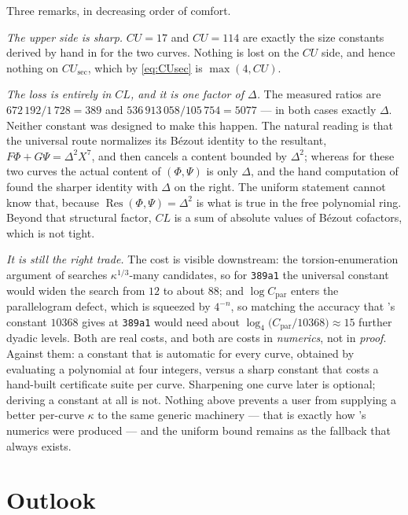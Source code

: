 \documentclass[11pt,reqno]{amsart}
\theoremstyle{plain}
\theoremstyle{definition}
\theoremstyle{remark}
\DeclareMathOperator{\Res}{Res}
\begin{document}
Three remarks, in decreasing order of comfort.

\emph{The upper side is sharp.} $CU = 17$ and $CU = 114$ are exactly the
size constants derived by hand in \cite{MW} for the two curves. Nothing
is lost on the $CU$ side, and hence nothing on $CU_{\mathrm{sec}}$,
which by \eqref{eq:CUsec} is $\max(4,CU)$.

\emph{The loss is entirely in $CL$, and it is one factor of $\Delta$.}
The measured ratios are
$672\,192/1\,728 = 389$ and $536\,913\,058/105\,754 = 5077$ --- in both
cases exactly $\Delta$. Neither constant was designed to make this
happen. The natural reading is that the universal route normalizes its
B\'ezout identity to the resultant, $F\Phi + G\Psi = \Delta^2X^7$, and
then cancels a content bounded by $\Delta^2$; whereas for these two
curves the actual content of $(\Phi,\Psi)$ is only $\Delta$, and the
hand computation of \cite{MW} found the sharper identity with $\Delta$
on the right. The uniform statement cannot know that, because
$\Res(\Phi,\Psi) = \Delta^2$ is what is true in the free polynomial
ring. Beyond that structural factor, $CL$ is a sum of absolute values of
B\'ezout cofactors, which is not tight.

\emph{It is still the right trade.} The cost is visible downstream: the
torsion-enumeration argument of \cite{MW} searches
$\kappa^{1/3}$-many candidates, so for \texttt{389a1} the universal
constant would widen the search from $12$ to about $88$; and
$\log C_{\mathrm{par}}$ enters the parallelogram defect, which is
squeezed by $4^{-n}$, so matching the accuracy that \cite{MW}'s
constant $10368$ gives at \texttt{389a1} would need about
$\log_4\bigl(C_{\mathrm{par}}/10368\bigr) \approx 15$ further dyadic
levels. Both are real costs, and both are
costs in \emph{numerics}, not in \emph{proof}. Against them: a constant
that is automatic for every curve, obtained by evaluating a polynomial
at four integers, versus a sharp constant that costs a hand-built
certificate suite per curve. Sharpening one curve later is optional;
deriving a constant at all is not. Nothing above prevents a user from
supplying a better per-curve $\kappa$ to the same generic machinery ---
that is exactly how \cite{MW}'s numerics were produced --- and the
uniform bound remains as the fallback that always exists.

\section{Outlook}
\end{document}

